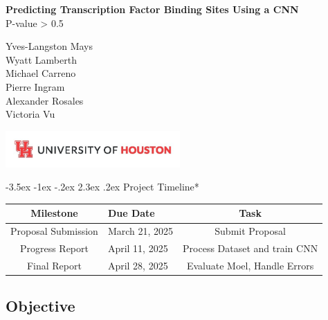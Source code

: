 \documentclass{report}
\makeatletter
\renewcommand\section{\@startsection{section}{1}{\z@}%
  {-3.5ex \@plus -1ex \@minus -.2ex}%
  {2.3ex \@plus.2ex}%
  {\normalfont\Large\bfseries}}
\makeatother
\begin{document}
\begin{titlepage}
    \centering
    \vspace*{5cm}
    
    {\Huge \textbf{Predicting Transcription Factor Binding Sites Using a CNN}} \\[1.5em]
    
    {\Large P-value > 0.5} \\[1.5em]
    
    \begin{center}
        {\large
        Yves-Langston Mays \\
        Wyatt Lamberth \\
        Michael Carreno \\
        Pierre Ingram \\
        Alexander Rosales \\
        Victoria Vu
        }
    \end{center}
    
    \vfill
    \includegraphics[width=0.5\textwidth]{UHLogo_Long.png}
    \vspace{0.8cm}
\end{titlepage}


\begingroup
\let\clearpage\relax
\tableofcontents
\endgroup
\relax
\relax

\newpage

\section{Project Timeline*}\label{project-timeline}

\begin{longtable}[]{@{}clc@{}}
\toprule\noalign{}
Milestone & Due Date & Task \\
\midrule\noalign{}
\endhead
\bottomrule\noalign{}
\endlastfoot
Proposal Submission & March 21, 2025 & Submit Proposal \\
Progress Report & April 11, 2025 & Process Dataset and train CNN \\
Final Report & April 28, 2025 & Evaluate Moel, Handle Errors \\
\end{longtable}

\subsection{Objective}\label{objective}
\end{document}
